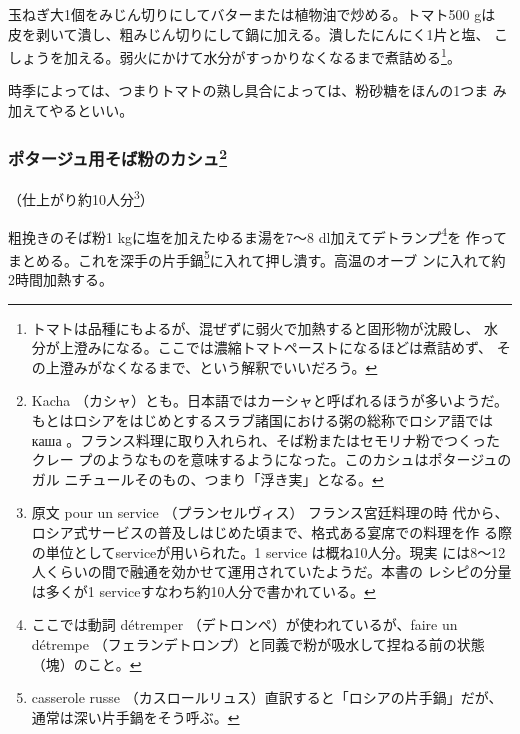 \begin{recette}
玉ねぎ大1個をみじん切りにしてバターまたは植物油で炒める。トマト500 gは
皮を剥いて潰し、粗みじん切りにして鍋に加える。潰したにんにく1片と塩、
こしょうを加える。弱火にかけて水分がすっかりなくなるまで煮詰める\footnote{トマトは品種にもよるが、混ぜずに弱火で加熱すると固形物が沈殿し、
  水分が上澄みになる。ここでは濃縮トマトペーストになるほどは煮詰めず、
  その上澄みがなくなるまで、という解釈でいいだろう。}。

時季によっては、つまりトマトの熟し具合によっては、粉砂糖をほんの1つま
み加えてやるといい。

\maeaki

\hypertarget{kache-de-sarrazin-pour-potage}{%
\subsubsection[ポタージュ用そば粉のカシュ]{\texorpdfstring{ポタージュ用そば粉のカシュ\footnote{Kacha
  （カシャ）とも。日本語ではカーシャと呼ばれるほうが多いようだ。
  もとはロシアをはじめとするスラブ諸国における粥の総称でロシア語では
  каша
  。フランス料理に取り入れられ、そば粉またはセモリナ粉でつくったクレー
  プのようなものを意味するようになった。このカシュはポタージュのガル
  ニチュールそのもの、つまり「浮き実」となる。}}{ポタージュ用そば粉のカシュ}}\label{kache-de-sarrazin-pour-potage}}



（仕上がり約10人分\footnote{原文 pour un service （プランセルヴィス）
  フランス宮廷料理の時
  代から、ロシア式サービスの普及しはじめた頃まで、格式ある宴席での料理を作
  る際の単位としてserviceが用いられた。1 service は概ね10人分。現実
  には8〜12人くらいの間で融通を効かせて運用されていたようだ。本書の
  レシピの分量は多くが1 serviceすなわち約10人分で書かれている。}）

粗挽きのそば粉1 kgに塩を加えたゆるま湯を7〜8
dl加えてデトランプ\footnote{ここでは動詞 détremper
  （デトロンペ）が使われているが、faire un détrempe
  （フェランデトロンプ）と同義で粉が吸水して捏ねる前の状態（塊）のこと。}を
作ってまとめる。これを深手の片手鍋\footnote{casserole russe
  （カスロールリュス）直訳すると「ロシアの片手鍋」だが、通常は深い片手鍋をそう呼ぶ。}に入れて押し潰す。高温のオーブ
ンに入れて約2時間加熱する。


\end{recette}
